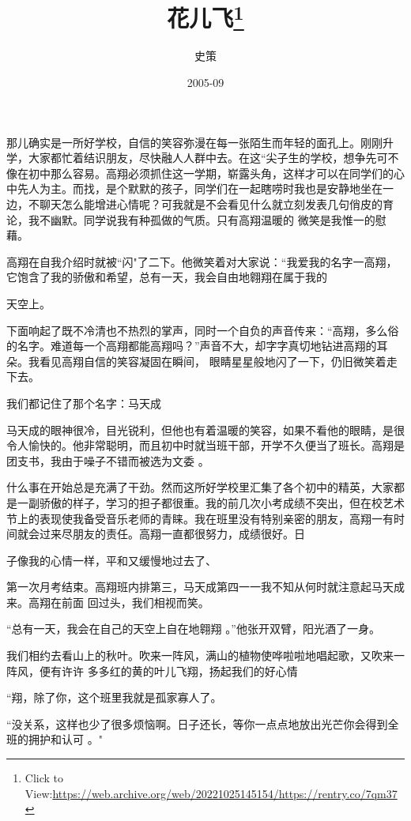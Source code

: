 \documentclass{article}
\title{花儿飞\footnote{Click to View:\url{https://web.archive.org/web/20221025145154/https://rentry.co/7qm37}}}
\author{史策}
\date{2005-09}
\begin{document}

\maketitle


\Large

﻿那儿确实是一所好学校，自信的笑容弥漫在每一张陌生而年轻的面孔上。刚刚升学，大家都忙着结识朋友，尽快融人人群中去。在这“尖子生的学校，想争先可不像在初中那么容易。高翔必须抓住这一学期，崭露头角，这样才可以在同学们的心中先人为主。而找，是个默默的孩子，同学们在一起瞎唠时我也是安静地坐在一边，不聊天怎么能增进心情呢？可我就是不会看见什么就立刻发表几句俏皮的育论，我不幽默。同学说我有种孤做的气质。只有高翔温暖的
微笑是我惟一的慰藉。 

高翔在自我介绍时就被“闪"了二下。他微笑着对大家说：“我爱我的名字一高翔，它饱含了我的骄傲和希望，总有一天，我会自由地翱翔在属于我的

\newpage
天空上。 

下面响起了既不冷清也不热烈的掌声，同时一个自负的声音传来：“高翔，多么俗的名字。难道每一个高翔都能高翔吗？”声音不大，却字字真切地钻进高翔的耳朵。我看见高翔自信的笑容凝固在瞬间，
眼睛星星般地闪了一下，仍旧微笑着走下去。 


我们都记住了那个名字：马天成 

马天成的眼神很冷，目光锐利，但他也有着温暖的笑容，如果不看他的眼睛，是很令人愉快的。他非常聪明，而且初中时就当班干部，开学不久便当了班长。高翔是团支书，我由于噪子不错而被选为文委
。 

什么事在开始总是充满了干劲。然而这所好学校里汇集了各个初中的精英，大家都是一副骄傲的样子，学习的担子都很重。我的前几次小考成绩不突出，但在校艺术节上的表现使我备受音乐老师的青睐。我在班里没有特别亲密的朋友，高翔一有时间就会过来尽朋友的责任。高翔一直都很努力，成绩很好。日
\newpage

子像我的心情一样，平和又缓慢地过去了、 

第一次月考结束。高翔班内排第三，马天成第四一一我不知从何时就注意起马天成来。高翔在前面
回过头，我们相视而笑。 

“总有一天，我会在自己的天空上自在地翱翔
。”他张开双臂，阳光酒了一身。 

我们相约去看山上的秋叶。吹来一阵风，满山的植物使哗啦啦地唱起歌，又吹来一阵风，便有许许
多多红的黄的叶儿飞翔，扬起我们的好心情 

“翔，除了你，这个班里我就是孤家寡人了。
 

“没关系，这样也少了很多烦恼啊。日子还长，等你一点点地放出光芒你会得到全班的拥护和认可
。" 
\end{document}

